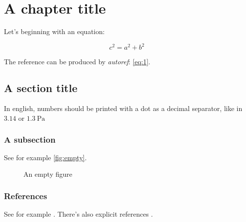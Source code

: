 \documentclass[a4,brazil,english]{brthesis}
\begin{document}
\renewcommand{\nomname}{\listadesimbolosname}
\pdfbookmark[0]{\nomname}{las}
\printnomenclature
\cleardoublepage

\tableofcontents*
\cleardoublepage

\textual

\chapter{A chapter title}
\label{cha:chapter-title}

Let's beginning with an equation:

\begin{equation}
  \label{eq:1}
  c^2 = a^2 + b^2
\end{equation}

The reference can be produced by \textsl{autoref}: \autoref{eq:1}.

\section{A section title}
\label{sec:section-title}

In english, numbers should be printed with a dot as a decimal separator, like in $\num{3.14}$ or $\SI{1.3}{\pascal}$

\subsection{A subsection}
\label{sec:subsection}

See for example \autoref{fig:empty}.

\begin{figure}[!ht]
  \centering
  
  \caption{An empty figure}
  \label{fig:empty}
\end{figure}

\subsection{References}
\label{sec:references}

See for example . There's also explicit references \cite{bib:furlani}.


\postextual


\end{document}
